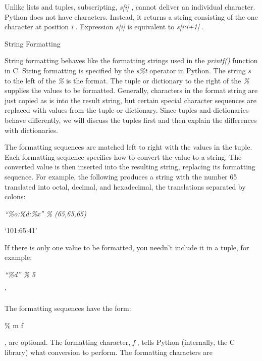 Unlike lists and tuples,
subscripting, \emph{s{[}i{]}} , cannot deliver an individual character.
Python does not have characters. Instead, it returns a string consisting
of the one character at position \emph{i} . Expression \emph{s{[}i{]}}
is equivalent to \emph{s{[}i:i+1{]}} .

String Formatting

String formatting behaves like the
formatting strings used in the \emph{printf()} function in C. String
formatting is specified by the \emph{s\%t} operator in Python. The
string \emph{s} to the left of the \emph{\%} is the format. The tuple or
dictionary to the right of the \emph{\%} supplies the values to be
formatted. Generally, characters in the format string are just copied as
is into the result string, but certain special character sequences are
replaced with values from the tuple or dictionary. Since tuples and
dictionaries behave differently, we will discuss the tuples first and
then explain the differences with dictionaries.

 The formatting
sequences are matched left to right with the values in the tuple. Each
formatting sequence specifies how to convert the value to a string. The
converted value is then inserted into the resulting string, replacing
its formatting sequence. For example, the following produces a string
with the number 65 translated into octal, decimal, and hexadecimal, the
translations separated by colons:


\emph{``\%o:\%d:\%x'' \% (65,65,65)}

`101:65:41'

If there is only one value to be
formatted, you needn't include it in a tuple, for example:


\emph{``\textbar{}\%d\textbar{}'' \% 5}

'

The formatting sequences have the
form:

\% m f

 , are
optional. The formatting character, \emph{f} , tells Python (internally,
the C library) what conversion to perform. The formatting characters are

